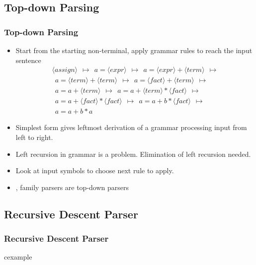 \subsection{Top-down Parsing}
\begin{frame}
\frametitle{Top-down Parsing}
\begin{itemize}
\item Start from the starting non-terminal, apply grammar rules to 
	reach the input sentence 
	{\small
	\[ \begin{array}{l}
	\langle assign \rangle ~~ \mapsto
	~~ a = \langle expr\rangle  ~~ \mapsto
	~~ a = \langle expr\rangle + \langle term\rangle  ~~ \mapsto \\
	~~ a = \langle term\rangle + \langle term\rangle  ~~ \mapsto
	~~ a = \langle fact \rangle + \langle term\rangle  ~~ \mapsto \\
	~~ a = a + \langle term\rangle  ~~ \mapsto 
	~~ a = a + \langle term\rangle * \langle fact\rangle  ~~ \mapsto \\
	~~ a = a + \langle fact\rangle * \langle fact\rangle  ~~ \mapsto 
	~~ a = a + b * \langle fact\rangle  ~~ \mapsto  \\
	~~ a = a + b * a  
\end{array}
	\]}
\item Simplest form gives leftmost derivation of a grammar processing input
	from left to right.
\item Left recursion in grammar is a problem. Elimination of left recursion
	needed.
\item {} Look at input symbols to choose next
	rule to apply.
\item {},  family parsers 
	are top-down parsers
\end{itemize}
\end{frame}

\begin{frame}
\subsection{Recursive Descent Parser}
\frametitle{Recursive Descent Parser}
\begin{beamercolorbox}{cexample}
\coderdparser
\end{beamercolorbox}
\end{frame}

